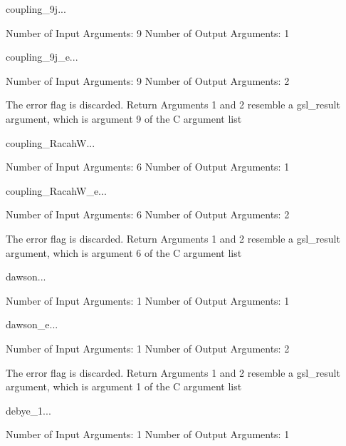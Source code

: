 \begin{funcdesc}{coupling_9j}{...}

    Number of Input  Arguments:  9
    Number of Output Arguments:  1
\end{funcdesc}

\begin{funcdesc}{coupling_9j_e}{...}

    Number of Input  Arguments:  9
    Number of Output Arguments:  2

The error flag is discarded.
Return Arguments 1 and 2 resemble a gsl_result argument,
	which is  argument 9 of the C argument list

\end{funcdesc}

\begin{funcdesc}{coupling_RacahW}{...}

    Number of Input  Arguments:  6
    Number of Output Arguments:  1
\end{funcdesc}

\begin{funcdesc}{coupling_RacahW_e}{...}

    Number of Input  Arguments:  6
    Number of Output Arguments:  2

The error flag is discarded.
Return Arguments 1 and 2 resemble a gsl_result argument,
	which is  argument 6 of the C argument list

\end{funcdesc}

\begin{funcdesc}{dawson}{...}

    Number of Input  Arguments:  1
    Number of Output Arguments:  1
\end{funcdesc}

\begin{funcdesc}{dawson_e}{...}

    Number of Input  Arguments:  1
    Number of Output Arguments:  2

The error flag is discarded.
Return Arguments 1 and 2 resemble a gsl_result argument,
	which is  argument 1 of the C argument list

\end{funcdesc}

\begin{funcdesc}{debye_1}{...}

    Number of Input  Arguments:  1
    Number of Output Arguments:  1
\end{funcdesc}

